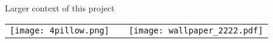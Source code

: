 \documentclass[final]{beamer}
\newlength{\onecolwid}
\begin{document}
\begin{frame}[t]
\begin{columns}[t]
\begin{column}{\onecolwid}
\begin{alertblock}{Larger context of this project}
\begin{center}
\begin{tabular}{ccc}
\texttt{[image: 4pillow.png]} & \hfill & \texttt{[image: wallpaper\_2222.pdf]}
\end{tabular}
\end{center}
\end{alertblock}

\end{column} %

\end{columns} %

\end{frame} %
\end{document}
